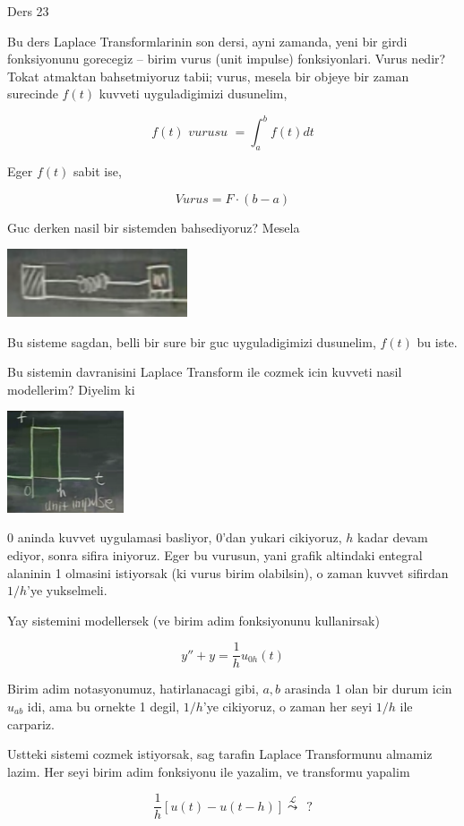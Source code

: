 \documentclass[12pt,fleqn]{article}
\begin{document}
Ders 23 

Bu ders Laplace Transformlarinin son dersi, ayni zamanda, yeni bir girdi
fonksiyonunu gorecegiz -- birim vurus (unit impulse) fonksiyonlari. Vurus
nedir? Tokat atmaktan bahsetmiyoruz tabii; vurus, mesela bir objeye bir zaman
surecinde $f(t)$ kuvveti uyguladigimizi dusunelim, 

\[ f(t) \textit{ vurusu } = \int _{a}^{b}f(t)dt \]

Eger $f(t)$ sabit ise, 

\[ Vurus = F \cdot (b-a) \]

Guc derken nasil bir sistemden bahsediyoruz? Mesela

\includegraphics[height=2cm]{23_1.png}

Bu sisteme sagdan, belli bir sure bir guc uyguladigimizi dusunelim, $f(t)$
bu iste. 

Bu sistemin davranisini Laplace Transform ile cozmek icin kuvveti nasil
modellerim? Diyelim ki 

\includegraphics[height=3cm]{23_2.png}

0 aninda kuvvet uygulamasi basliyor, 0'dan yukari cikiyoruz, $h$ kadar
devam ediyor, sonra sifira iniyoruz. Eger bu vurusun, yani grafik altindaki
entegral alaninin 1 olmasini istiyorsak (ki vurus birim olabilsin), o zaman
kuvvet sifirdan $1/h$'ye yukselmeli. 

Yay sistemini modellersek (ve birim adim fonksiyonunu kullanirsak)

\[ y'' + y  = \frac{1}{h}u_{0h}(t) \]

Birim adim notasyonumuz, hatirlanacagi gibi, $a,b$ arasinda 1 olan bir
durum icin $u_{ab}$ idi, ama bu ornekte 1 degil, $1/h$'ye cikiyoruz, o
zaman her seyi $1/h$ ile carpariz.

Ustteki sistemi cozmek istiyorsak, sag tarafin Laplace Transformunu almamiz
lazim. Her seyi birim adim fonksiyonu ile yazalim, ve transformu yapalim

\[ \frac{1}{h} [ u(t) - u(t-h) ] 
\stackrel{\mathcal{L}}{\leadsto} \ \ ?
\]
\end{document}
